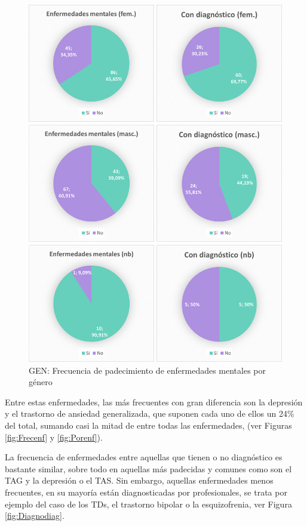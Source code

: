\documentclass[12pt, a4paper,twoside,titlepage]{book}
\begin{document}
\begin{figure}
\centering
 \includegraphics[width=1\linewidth]{Imagenes Form GEN/13GENEnfgeneros}
 \caption{GEN: Frecuencia de padecimiento de enfermedades mentales por género}
 \label{fig:Enfdiaggeneros}
 \end{figure}

Entre estas enfermedades, las más frecuentes con gran diferencia son la depresión y el trastorno de ansiedad generalizada, que suponen cada uno de ellos un 24\% del total, sumando casi la mitad de entre todas las enfermedades, (ver Figuras \ref{fig:Frecenf} y \ref{fig:Porenf}). 

La frecuencia de enfermedades entre aquellas que tienen o no diagnóstico es bastante similar, sobre todo en aquellas más padecidas y comunes como son el TAG y la depresión o el TAS. Sin embargo, aquellas enfermedades menos frecuentes, en su mayoría están diagnosticadas por profesionales, se trata por ejemplo del caso de los TDs, el trastorno bipolar o la esquizofrenia, ver Figura \ref{fig:Diagnodiag}. 
\end{document}
